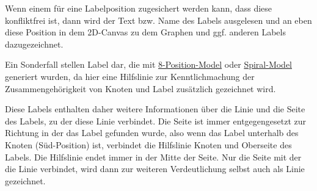 
Wenn einem für eine Labelposition zugesichert werden kann, dass diese konfliktfrei ist,
dann wird der Text bzw. Name des Labels ausgelesen und an eben diese Position in dem 2D-Canvas zu dem Graphen und ggf. anderen Labels dazugezeichnet.

Ein Sonderfall stellen Label dar, die mit \hyperref[subsubsec:8pos]{8-Position-Model} oder \hyperref[subsubsec:spiral]{Spiral-Model} generiert wurden,
da hier eine Hilfslinie zur Kenntlichmachung der Zusammengehörigkeit von Knoten und Label zusätzlich gezeichnet wird.

Diese Labels enthalten daher weitere Informationen über die Linie und die Seite des Labels, zu der diese Linie verbindet.
Die Seite ist immer entgegengesetzt zur Richtung in der das Label gefunden wurde, also wenn das Label unterhalb des Knoten (Süd-Position) ist, verbindet die Hilfslinie Knoten und Oberseite des Labels.
Die Hilfslinie endet immer in der Mitte der Seite.
Nur die Seite mit der die Linie verbindet, wird dann zur weiteren Verdeutlichung selbst auch als Linie gezeichnet.